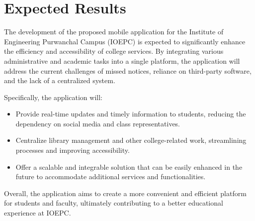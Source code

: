 \chapter{Expected Results}

The development of the proposed mobile application for the Institute of Engineering Purwanchal Campus (IOEPC) is expected to significantly enhance the efficiency and accessibility of college services. By integrating various administrative and academic tasks into a single platform, the application will address the current challenges of missed notices, reliance on third-party software, and the lack of a centralized system. 

Specifically, the application will:
\begin{itemize}
    \item Provide real-time updates and timely information to students, reducing the dependency on social media and class representatives.
    \item Centralize library management and other college-related work, streamlining processes and improving accessibility.
    \item Offer a scalable and integrable solution that can be easily enhanced in the future to accommodate additional services and functionalities.
\end{itemize}

Overall, the application aims to create a more convenient and efficient platform for students and faculty, ultimately contributing to a better educational experience at IOEPC.